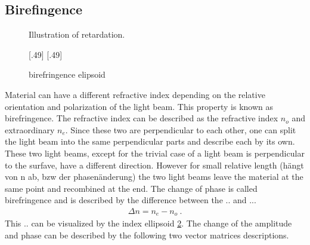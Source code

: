 \subsection{Birefingence}
%
\begin{figure}[!t]
\centering
\setlength{\tikzwidth}{\textwidth}
\caption{Illustration of retardation.}
\label{fig:optic_retardation}
\end{figure}
% 
\begin{figure}[!t]
\centering
\subcaptionbox{}[.49\textwidth]{
\setlength{\tikzwidth}{0.49\textwidth}
}
\subcaptionbox{}[.49\textwidth]{
\setlength{\tikzwidth}{0.49\textwidth}
}
\caption{birefringence elipsoid}
\label{fig:index_elipsoid}
\end{figure}
% 
Material can have a different refractive index depending on the relative orientation and polarization of the light beam.
This property is known as birefringence.
The refractive index can be described as the refractive index $n_o$ and extraordinary  $n_e$.
Since these two are perpendicular to each other, one can split the light beam into the same perpendicular parts and describe each by its own.
These two light beams, except for the trivial case of a light beam is perpendicular to the surfave, have a different direction.
However for small relative length (hängt von n ab, bzw der phasenänderung) the two light beams leave the material at the same point and recombined at the end.
The change of phase is called birefringence and is described by the difference between the .. and ...
% 
\begin{align}
    \Delta n = n_e - n_o \> .
\end{align}
% 
This .. can be visualized by the index ellipsoid \cref{fig:index_elipsoid}.
The change of the amplitude and phase can be described by the following two vector matrices descriptions.
% 
% 
% 
